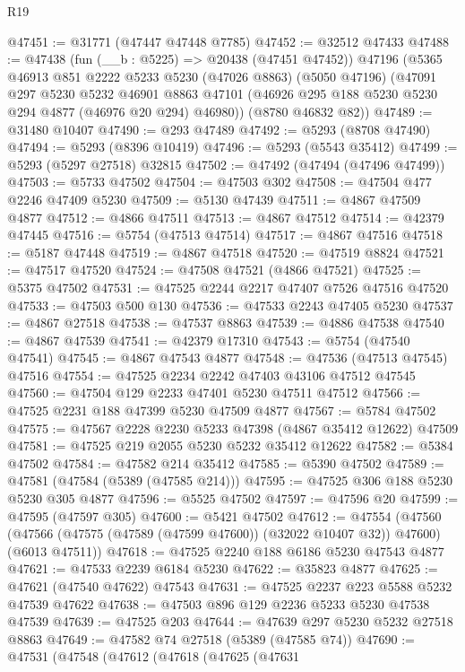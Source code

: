 \begin{lexlean}{R19}
\begin{coremodule}
@47451 := @31771 (@47447 @47448 @7785)
@47452 := @32512 @47433
@47488 := @47438
    (fun (__b : @5225) => @20438 (@47451 @47452))
    @47196
    (@5365
      @46913
      @851
      @2222
      @5233
      @5230
      (@47026 @8863)
      (@5050 @47196)
      (@47091
        @297
        @5230
        @5232
        @46901
        @8863
        @47101
        (@46926 @295 @188 @5230 @5230 @294 @4877 (@46976 @20 @294) @46980))
      (@8780 @46832 @82))
@47489 := @31480 @10407
@47490 := @293 @47489
@47492 := @5293 (@8708 @47490)
@47494 := @5293 (@8396 @10419)
@47496 := @5293 (@5543 @35412)
@47499 := @5293 (@5297 @27518) @32815
@47502 := @47492 (@47494 (@47496 @47499))
@47503 := @5733 @47502
@47504 := @47503 @302
@47508 := @47504 @477 @2246 @47409 @5230
@47509 := @5130 @47439
@47511 := @4867 @47509 @4877
@47512 := @4866 @47511
@47513 := @4867 @47512
@47514 := @42379 @47445
@47516 := @5754 (@47513 @47514)
@47517 := @4867 @47516
@47518 := @5187 @47448
@47519 := @4867 @47518
@47520 := @47519 @8824
@47521 := @47517 @47520
@47524 := @47508 @47521 (@4866 @47521)
@47525 := @5375 @47502
@47531 := @47525 @2244 @2217 @47407 @7526 @47516 @47520
@47533 := @47503 @500 @130
@47536 := @47533 @2243 @47405 @5230
@47537 := @4867 @27518
@47538 := @47537 @8863
@47539 := @4886 @47538
@47540 := @4867 @47539
@47541 := @42379 @17310
@47543 := @5754 (@47540 @47541)
@47545 := @4867 @47543 @4877
@47548 := @47536 (@47513 @47545) @47516
@47554 := @47525 @2234 @2242 @47403 @43106 @47512 @47545
@47560 := @47504 @129 @2233 @47401 @5230 @47511 @47512
@47566 := @47525 @2231 @188 @47399 @5230 @47509 @4877
@47567 := @5784 @47502
@47575 := @47567 @2228 @2230 @5233 @47398 (@4867 @35412 @12622) @47509
@47581 := @47525 @219 @2055 @5230 @5232 @35412 @12622
@47582 := @5384 @47502
@47584 := @47582 @214 @35412
@47585 := @5390 @47502
@47589 := @47581 (@47584 (@5389 (@47585 @214)))
@47595 := @47525 @306 @188 @5230 @5230 @305 @4877
@47596 := @5525 @47502
@47597 := @47596 @20
@47599 := @47595 (@47597 @305)
@47600 := @5421 @47502
@47612 := @47554
    (@47560 (@47566 (@47575 (@47589 (@47599 @47600)) (@32022 @10407 @32)) @47600) (@6013 @47511))
@47618 := @47525 @2240 @188 @6186 @5230 @47543 @4877
@47621 := @47533 @2239 @6184 @5230
@47622 := @35823 @4877
@47625 := @47621 (@47540 @47622) @47543
@47631 := @47525 @2237 @223 @5588 @5232 @47539 @47622
@47638 := @47503 @896 @129 @2236 @5233 @5230 @47538 @47539
@47639 := @47525 @203
@47644 := @47639 @297 @5230 @5232 @27518 @8863
@47649 := @47582 @74 @27518 (@5389 (@47585 @74))
@47690 := @47531
    (@47548
      (@47612
        (@47618
          (@47625
            (@47631

\end{coremodule}
\end{lexlean}
